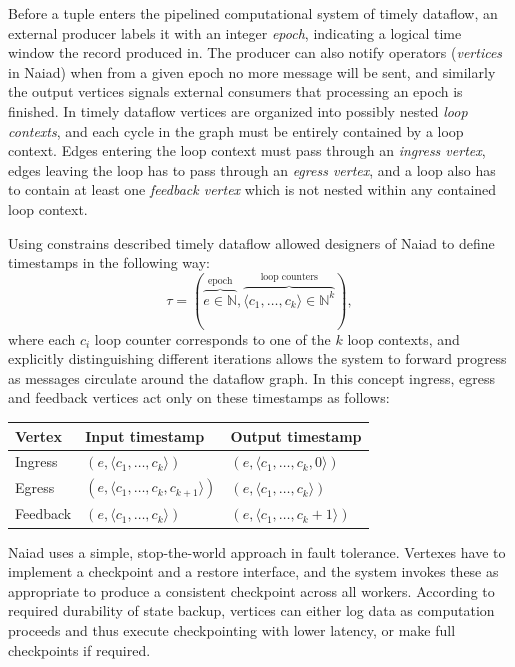 Before a tuple enters the pipelined computational system of timely dataflow, an external producer labels it with an integer \textit{epoch}, indicating a 
logical time window the record produced in. The producer can also notify operators (\textit{vertices} in Naiad) when from a given epoch no more message will be sent, and similarly the output vertices signals external consumers that processing an epoch is finished. In timely dataflow vertices are organized into possibly nested \textit{loop contexts}, and each cycle in the graph must be entirely contained by a loop context. Edges entering the loop context must pass through an \textit{ingress vertex}, edges leaving the loop has to pass through an \textit{egress vertex}, and a loop also has to contain at least one \textit{feedback vertex} which is not nested within any contained loop context.

Using constrains described  timely dataflow allowed designers of Naiad to define timestamps in the following way:
\begin{equation}
\tau=(\overbrace{e \in \mathbb{N}}^\text{epoch},\overbrace{\langle c_1,\dots,c_k \rangle \in \mathbb{N}^{k}}^\text{loop counters} ),
\end{equation} 
where each $c_i$ loop counter corresponds to one of the $k$ loop contexts, and explicitly distinguishing different iterations allows the system to forward progress as messages circulate around the dataflow graph. In this concept ingress, egress and feedback vertices act only on these timestamps as follows:
\begin{tabular}{l l l}
Vertex & Input timestamp & Output timestamp \\
\hline
Ingress & $(e,\langle c_1,\dots,c_k \rangle)$ & $(e,\langle c_1,\dots,c_k,0 \rangle)$\\
Egress & $(e,\langle c_1,\dots,c_k, c_{k+1} \rangle)$ & $(e,\langle c_1,\dots,c_k \rangle)$\\
Feedback & $(e,\langle c_1,\dots,c_k\rangle)$ & $(e,\langle c_1,\dots,c_k+1 \rangle)$\\
\end{tabular} 
Naiad uses a simple, stop-the-world approach in fault tolerance. Vertexes have to implement a checkpoint and a restore interface, and the system invokes these as appropriate to produce a consistent checkpoint across all workers. According to required durability of state backup, vertices can either log data as computation proceeds and thus execute checkpointing with lower latency, or make full checkpoints if required.

